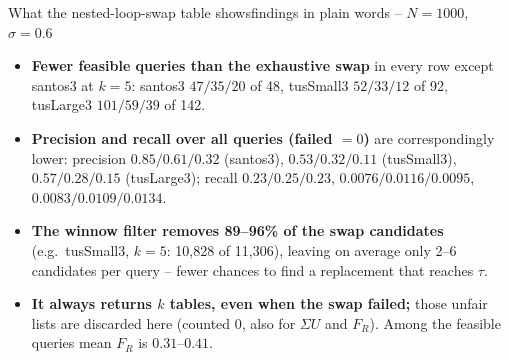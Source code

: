 \documentclass[aspectratio=169,10pt]{beamer}
\newcommand{\highlight}[1]{{\color{Cat1}\bfseries #1}}
\begin{document}
\begin{frame}{What the nested-loop-swap table shows}{findings in plain words -- $N{=}1000$, $\sigma{=}0.6$}
\small
\begin{itemize}\setlength\itemsep{4pt}
\item \highlight{Fewer feasible queries than the exhaustive swap} in every row except santos3 at $k{=}5$: santos3 $47/35/20$ of 48, tusSmall3 $52/33/12$ of 92, tusLarge3 $101/59/39$ of 142.
\item \highlight{Precision and recall over all queries (failed $=0$)} are correspondingly lower: precision $0.85/0.61/0.32$ (santos3), $0.53/0.32/0.11$ (tusSmall3), $0.57/0.28/0.15$ (tusLarge3); recall $0.23/0.25/0.23$, $0.0076/0.0116/0.0095$, $0.0083/0.0109/0.0134$.
\item \highlight{The winnow filter removes 89--96\% of the swap candidates} (e.g.\ tusSmall3, $k{=}5$: 10{,}828 of 11{,}306), leaving on average only 2--6 candidates per query -- fewer chances to find a replacement that reaches $\tau$.
\item \highlight{It always returns $k$ tables, even when the swap failed;} those unfair lists are discarded here (counted 0, also for $\Sigma U$ and $F_R$). Among the feasible queries mean $F_R$ is $0.31$--$0.41$.
\end{itemize}
\end{frame}
\end{document}
